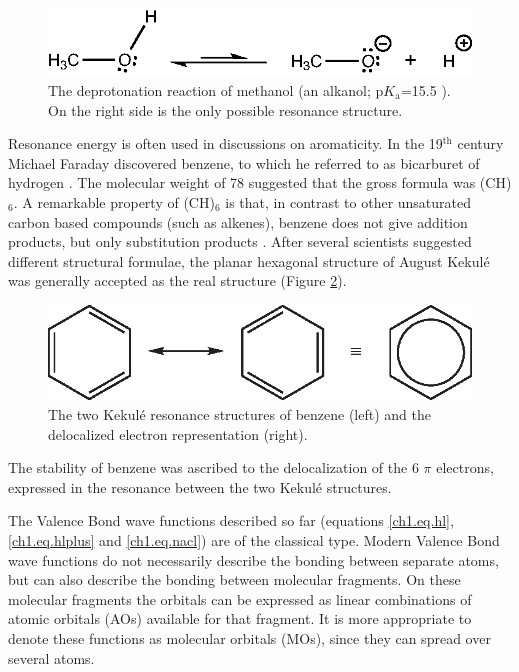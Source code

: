 \begin{figure}[hb]
\center
\includegraphics{introduction/figures/alcohol.eps}
\caption{The deprotonation reaction of methanol (an alkanol; p$K_\mathrm{a}$=15.5 \cite{bruice}). On the right side is the only possible resonance structure.}
\label{ch1.fig.alcohol}
\end{figure}

Resonance energy is often used in discussions on aromaticity. In the 19$^\mathrm{th}$ century Michael Faraday discovered benzene, to which he referred to as bicarburet of hydrogen \cite{faraday,bicarburet}. The molecular weight of 78 suggested that the gross formula was (CH)$_6$. A remarkable property of (CH)$_6$ is that, in contrast to other unsaturated carbon based compounds (such as alkenes), benzene does not give addition products, but only substitution products \cite{bruice}. After several scientists suggested different structural formulae, the planar hexagonal structure of August Kekul\'e \cite{kekule} was generally accepted as the real structure (Figure \ref{ch1.fig.benzene}). 
\begin{figure}[hb]
\center
\includegraphics{introduction/figures/benzene.eps}
\caption{The two Kekul\'e resonance structures of benzene (left) and the delocalized electron representation (right).}
\label{ch1.fig.benzene}
\end{figure}

The stability of benzene was ascribed to the delocalization of the 6 $\pi$ electrons, expressed in the resonance between the two Kekul\'e structures.

The Valence Bond wave functions described so far (equations \ref{ch1.eq.hl}, \ref{ch1.eq.hlplus} and \ref{ch1.eq.nacl}) are of the classical type. Modern Valence Bond wave functions do not necessarily describe the bonding between separate atoms, but can also describe the bonding between molecular fragments. On these molecular fragments the orbitals can be expressed as linear combinations of atomic orbitals (AOs) available for that fragment. It is more appropriate to denote these functions as molecular orbitals (MOs), since they can spread over several atoms. 

